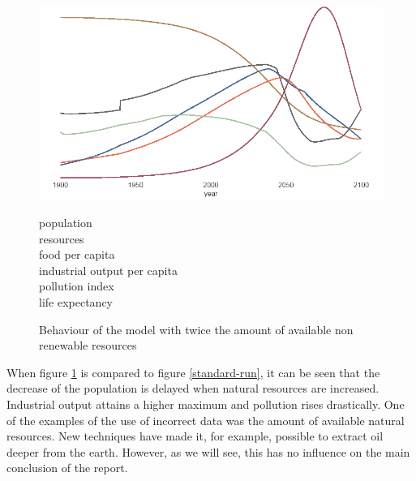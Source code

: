 \documentclass[10pt,a4paper]{scrartcl}
\begin{document}
\begin{figure}
\centering
\begin{minipage}{0.79\textwidth}
\includegraphics[width=\textwidth]{./plaatjes/multiplier-2.png}
\end{minipage}
\begin{minipage}{0.2\textwidth}
\textcolor[HTML]{e07154}{population}\\
\textcolor[HTML]{b0875e}{resources}\\
\textcolor[HTML]{a8c3a5}{food per capita}\\
\textcolor[HTML]{4a6892}{industrial output per capita}\\
\textcolor[HTML]{a25563}{pollution index}\\
\textcolor[HTML]{666666}{life expectancy}\\
\end{minipage}
\caption{Behaviour of the model with twice the amount of available non renewable resources}
\label{resources-2}
\end{figure}

When figure \ref{resources-2} is compared to figure \ref{standard-run}, it can be seen that the decrease of the population is delayed when natural resources are increased. Industrial output attains a higher maximum and pollution rises drastically. One of the examples of the use of incorrect data was the amount of available natural resources. New techniques have made it, for example, possible to extract oil deeper from the earth. However, as we will see, this has no influence on the main conclusion of the report.
\end{document}
